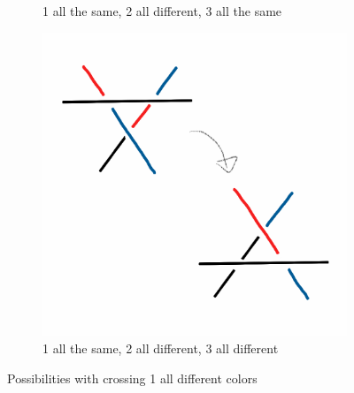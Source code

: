 \documentclass[12pt,letterpaper]{article}
\theoremstyle{definition}
\begin{document}
\begin{figure}[h!]
\begin{subfigure}{.3\textwidth}
        \caption{1 all the same, 2 all different, 3 all the same}
    \end{subfigure}
    \quad
    \begin{subfigure}{.3\textwidth}
        \centering
        \includegraphics[width=\textwidth]{meeting10pics/1d2d3d.png}
        \caption{1 all the same, 2 all different, 3 all different}
    \end{subfigure}
    \caption{Possibilities with crossing 1 all different colors}
\end{figure}
\end{document}
